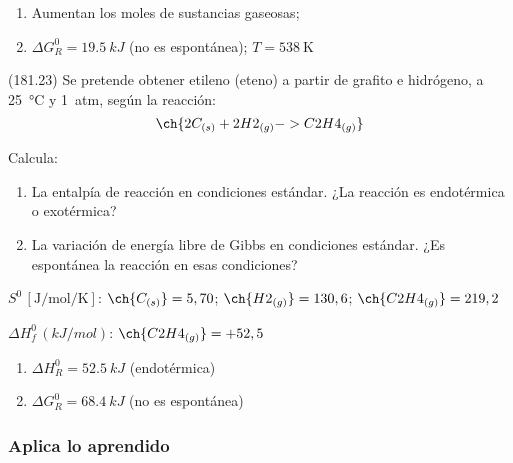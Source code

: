   \begin{solution}
    \begin{enumerate}
      \item Aumentan los moles de sustancias gaseosas; \item \( \Delta G^0_R = \SI{19.5}{kJ} \) (no es espontánea); \( T = \SI{538}{\kelvin} \)
    \end{enumerate}
  \end{solution}




  \begin{exercise}[
      tags    = {},
      topics  = {química, termodinámica, termoquímica},
      source  = {FQ 1B MGH 2016, p181, e23},
    ]
    (181.23) Se pretende obtener etileno (eteno) a partir de grafito e
    hidrógeno, a \SI{25}{\celsius} y \SI{1}{atm}, según la reacción:
    \[  \ch{2 C_{(s)} + 2 H2_{(g)} -> C2H4_{(g)}} \]

    Calcula:
    \begin{enumerate}
      \item La entalpía de reacción en condiciones estándar. ¿La reacción es endotérmica o exotérmica?
      \item La variación de energía libre de Gibbs en condiciones
      estándar. ¿Es espontánea la reacción en esas condiciones?
    \end{enumerate}

    \begin{gexdatos}
      \( S^0\,[\si{\joule\per\mole\per\kelvin}] \):
      \( \ch{C_{(s)}} = 5,70 \);
      \( \ch{H2_{(g)}} = 130,6 \);
      \( \ch{C2H4_{(g)}}= 219,2 \)

      \( \Delta H^0_f\,(\si{kJ/mol}) \):
      \( \ch{C2H4_{(g)}} = +52,5 \)
    \end{gexdatos}
  \end{exercise}

  \begin{solution}
    \begin{enumerate}
      \item \( \Delta H^0_R = \SI{+52.5}{kJ} \) (endotérmica)
      \item \( \Delta G^0_R = \SI{+68.4}{kJ} \) (no es espontánea)
    \end{enumerate}
  \end{solution}






  \subsubsection*{Aplica lo aprendido}


